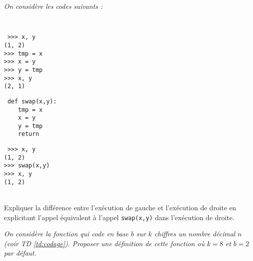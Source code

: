 \begin{td}\label{td:swap}
\em
On considère les codes suivants :

{\tt \mbox{}\ }\begin{py}{2.25cm}\tt
>>> x, y\\
(1, 2)\\
>>> tmp = x\\
>>> x = y\\
>>> y = tmp\\
>>> x, y\\
(2, 1)
\end{py}
\hfill
\begin{py}{3cm}\tt
def swap(x,y):\\
\mbox{}\ \ \ \ tmp = x\\
\mbox{}\ \ \ \ x = y\\
\mbox{}\ \ \ \ y = tmp\\
\mbox{}\ \ \ \ return
\end{py}
\hfill
\begin{py}{2.25cm}\tt
>>> x, y\\
(1, 2)\\
>>> swap(x,y)\\
>>> x, y\\
(1, 2)
\end{py}\\[1mm]
Expliquer la différence entre l'exécution de gauche et l'exécution de droite
en explicitant l'appel équivalent à l'appel {\tt swap(x,y)} dans l'exécution
de droite.
\end{td}

\begin{td}\label{td:defaut}
\em
On considère la fonction qui code en base $b$ sur $k$ chiffres
un nombre décimal $n$ (voir TD \ref{td:codage}). 
Proposer une définition de cette fonction où $k = 8$ et $b = 2$ par défaut.
\end{td}

